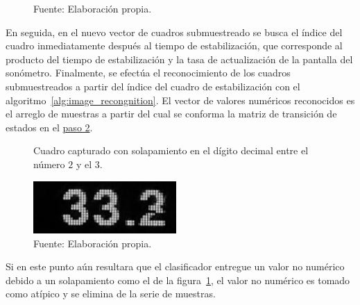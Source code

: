 \begin{figure}[!h]
    \caption*{\footnotesize Fuente: Elaboración propia.}
\end{figure}

En seguida, en el nuevo vector de cuadros submuestreado se busca el índice del cuadro inmediatamente después al tiempo
de estabilización, que corresponde al producto del tiempo de estabilización y la tasa de actualización de la pantalla
del sonómetro.
Finalmente, se efectúa el reconocimiento de los cuadros submuestreados a partir del índice del cuadro de estabilización
con el algoritmo~\ref{alg:image_recongnition}.
El vector de valores numéricos reconocidos es el arreglo de muestras a partir del cual se conforma la matriz de
transición de estados en el \hyperref[sec:transition_matrix]{paso 2}.

\begin{figure}[!h]
    \caption{Cuadro capturado con solapamiento en el dígito decimal entre el número $2$ y el $3$.}
    \label{fig:wrong_frame}
    \centering
    \includegraphics[height=2cm]{5_MC_incertidumbre/Frames/wrong_frame}
    \caption*{\footnotesize Fuente: Elaboración propia.}
\end{figure}
%
Si en este punto aún resultara que el clasificador entregue un valor no numérico debido a un solapamiento como el de
la figura~\ref{fig:wrong_frame}, el valor no numérico es tomado como atípico y se elimina de la serie de muestras.

